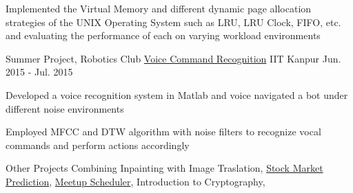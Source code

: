 \begin{cventries}
{\begin{cvitems}
        \item {Implemented the Virtual Memory and different dynamic page allocation strategies of the UNIX Operating System such as LRU, LRU Clock, FIFO, etc. and evaluating the performance of each on varying workload environments}
      \end{cvitems}
    }
  \cventry
    {Summer Project, Robotics Club}
    {\href{https://bitbucket.org/arhamchopra11/voicecommandrecognition}{Voice Command Recognition}}
    {IIT Kanpur}
    {Jun. 2015 - Jul. 2015}
    {
      \begin{cvitems}
        \item {Developed a voice recognition system in Matlab and voice navigated a bot under different noise environments}
        \item {Employed MFCC and DTW algorithm with noise filters to recognize vocal commands and perform actions accordingly}
      \end{cvitems}
    }
  \cventry
    {Other Projects}
    {}
    {}
    {}
    {
      Combining Inpainting with Image Traslation, 
      \href{https://bitbucket.org/arhamchopra11/stockprediction}{Stock Market Prediction}, 
      \href{https://bitbucket.org/arhamchopra11/meetupscheduler}{Meetup Scheduler}, 
      Introduction to Cryptography, 
    }
\end{cventries}
